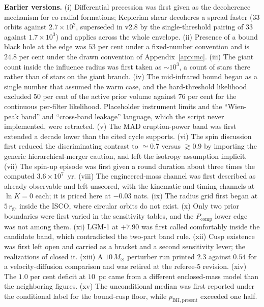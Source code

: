 \documentclass[11pt]{article}
\newcommand{\msun}{\ensuremath{M_\odot}}
\newcommand{\rg}{\ensuremath{r_{\mathrm{g}}}}
\newcommand{\lnK}{\ensuremath{\ln K}}
\begin{document}
\textbf{Earlier versions.} (i) Differential precession was first given as the decoherence mechanism for co-radial formations; Keplerian shear decoheres a spread faster ($33$ orbits against $2.7\times10^{2}$, superseded in v2.8 by the single-threshold pairing of $33$ against $1.7\times10^{3}$) and applies across the whole envelope. (ii) Presence of a bound black hole at the edge was $53$ per cent under a fixed-number convention and is $24.8$ per cent under the drawn convention of Appendix~\ref{app:mc}. (iii) The giant count inside the influence radius was first taken as $\sim 10^{3}$, a count of stars there rather than of stars on the giant branch. (iv) The mid-infrared bound began as a single number that assumed the warm case, and the hard-threshold likelihood excluded $50$ per cent of the active prior volume against $76$ per cent for the continuous per-filter likelihood. Placeholder instrument limits and the ``Wien-peak band'' and ``cross-band leakage'' language, which the script never implemented, were retracted. (v) The MAD eruption-power band was first extended a decade lower than the cited cycle supports. (vi) The spin discussion first reduced the discriminating contrast to $\simeq 0.7$ versus $\gtrsim 0.9$ by importing the generic hierarchical-merger caution, and left the isotropy assumption implicit. (vii) The spin-up episode was first given a round duration about three times the computed $3.6\times10^{7}$~yr. (viii) The engineered-mass channel was first described as already observable and left unscored, with the kinematic and timing channels at $\lnK = 0$ each; it is priced here at $-0.03$ nats. (ix) The radius grid first began at $5\,\rg$, inside the ISCO, where circular orbits do not exist. (x) Only two prior boundaries were first varied in the sensitivity tables, and the $P_{\mathrm{comp}}$ lower edge was not among them. (xi) LGM-1 at $+7.90$ was first called comfortably inside the candidate band, which contradicted the two-part band rule. (xii) Cusp existence was first left open and carried as a bracket and a second sensitivity lever; the realizations of \citet{GonzalezPrieto2025} closed it. (xiii) A $10\,\msun$ perturber run printed $2.3$ against $0.54$ for a velocity-diffusion comparison and was retired at the referee-5 revision. (xiv) The $1.0$ per cent deficit at $10$~pc came from a different enclosed-mass model than the neighboring figures. (xv) The unconditional median was first reported under the conditional label for the bound-cusp floor, while $p_{\mathrm{BH,present}}$ exceeded one half.

\end{document}
